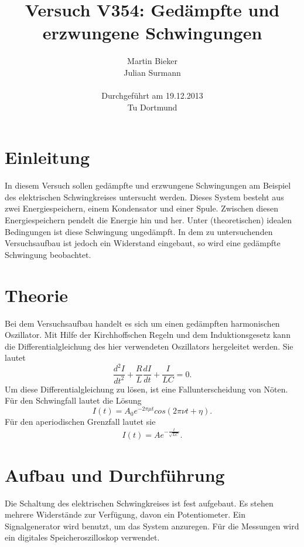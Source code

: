 \documentclass[11pt,ngerman,a4paper]{article}
\title{\textbf{Versuch V354: Gedämpfte und erzwungene Schwingungen}}
\author{Martin Bieker\\
		Julian Surmann\\
		\\
		Durchgef\"{u}hrt am 19.12.2013\\
		Tu Dortmund}
\date{}
\begin{document}
\renewcommand\tablename{Tabelle}
\renewcommand\figurename{Abbildung}
\maketitle
\thispagestyle{empty}
\newpage
\clearpage
\setcounter{page}{1}


\section{Einleitung}
In diesem Versuch sollen gedämpfte und erzwungene Schwingungen am Beispiel des elektrischen Schwingkreises untersucht werden. Dieses System besteht aus zwei Energiespeichern, einem Kondensator und einer Spule. Zwischen diesen Energiespeichern pendelt die Energie hin und her. Unter (theoretischen) idealen Bedingungen ist diese Schwingung ungedämpft. In dem zu untersuchenden Versuchsaufbau ist jedoch ein Widerstand eingebaut, so wird eine gedämpfte Schwingung beobachtet.
\section{Theorie}
Bei dem Versuchsaufbau handelt es sich um einen gedämpften harmonischen Oszillator. Mit Hilfe der Kirchhoffschen Regeln und dem Induktionsgesetz kann die Differentialgleichung des hier verwendeten Oszillators hergeleitet werden. Sie lautet
\begin{equation}
\label{DGL}
\frac{d^2 I}{d t^2} + \frac{R}{L} \frac{d I}{d t} + \frac{I}{LC} = 0.
\end{equation}
Um diese Differentialgleichung zu lösen, ist eine Fallunterscheidung von Nöten.\newline
Für den Schwingfall lautet die Lösung
\begin{equation}
\label{LSG1}
I(t) = A_0 e^{-2 \pi \mu t} cos (2 \pi \nu t + \eta).
\end{equation}
Für den aperiodischen Grenzfall lautet sie
\begin{equation}
\label{LSG2}
I(t) = A e^{- \frac{t}{\sqrt{LC}}}.
\end{equation}
\section{Aufbau und Durchf\"{u}hrung}
Die Schaltung des elektrischen Schwingkreises ist fest aufgebaut. Es stehen mehrere Widerstände zur Verfügung, davon ein Potentiometer. Ein Signalgenerator wird benutzt, um das System anzuregen. Für die Messungen wird ein digitales Speicheroszilloskop verwendet.
\end{document}
